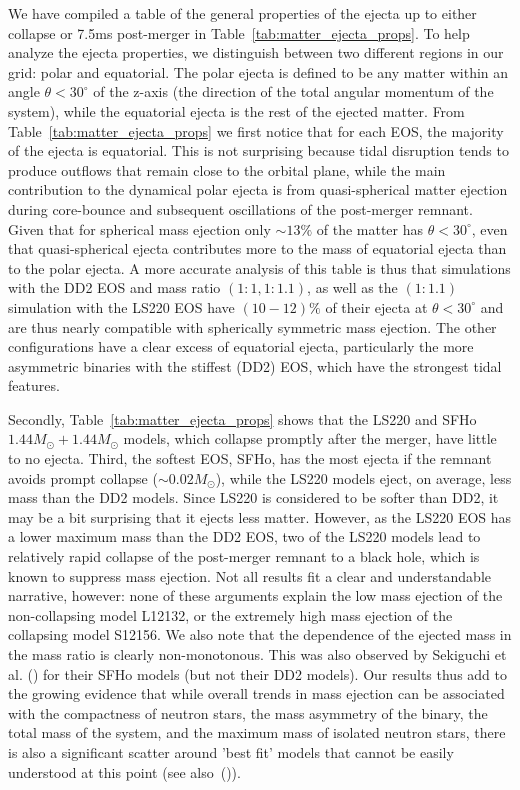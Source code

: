 We have compiled a table of the general properties of the ejecta up to either collapse or 7.5ms post-merger in Table~\ref{tab:matter_ejecta_props}. To help analyze the ejecta properties, we distinguish between two different regions in our grid: polar and equatorial.  The polar ejecta
is defined to be any matter within an angle $\theta < 30^\circ$ of the z-axis (the direction of the total angular momentum of the system), while the equatorial ejecta is the rest of the
ejected matter. From Table~\ref{tab:matter_ejecta_props} we first notice that for each EOS, the majority of the ejecta is equatorial. This is not surprising because tidal disruption tends to produce outflows that remain close to the orbital plane, while the main contribution to the dynamical polar ejecta is from quasi-spherical matter ejection during core-bounce and subsequent oscillations of the post-merger remnant. Given that for spherical mass ejection only $\sim 13\%$ of the matter has $\theta < 30^\circ$, even that quasi-spherical ejecta contributes more to the mass of equatorial ejecta than to the polar ejecta. A more accurate analysis of this table is thus that simulations with the DD2 EOS and mass ratio $(1:1,1:1.1)$, as well as the $(1:1.1)$ simulation with the LS220 EOS have $(10-12)\%$ of their ejecta at $\theta < 30^\circ$ and are thus nearly compatible with spherically symmetric mass ejection. The other configurations have a clear excess of equatorial ejecta, particularly the more asymmetric binaries with the stiffest (DD2) EOS, which have the strongest tidal features.

Secondly, Table~\ref{tab:matter_ejecta_props} shows that the LS220 and SFHo $1.44M_\odot + 1.44M_\odot$ models, which collapse promptly after the merger, have little to no ejecta. Third, the softest EOS, SFHo, has the most ejecta if the remnant avoids prompt collapse ($\sim 0.02M_\odot$), while the LS220 models eject, on average, less mass than the DD2 models. Since LS220 is considered to be softer than DD2, it may be a bit surprising that it ejects less matter. However, as the LS220 EOS has a lower maximum mass than the DD2 EOS, two of the LS220 models lead to relatively rapid collapse of the post-merger remnant to a black hole, which is known to suppress mass ejection. Not all results fit a clear and understandable narrative, however: none of these arguments explain the low mass ejection of the non-collapsing model L12132, or the extremely high mass ejection of the collapsing model S12156. We also note that the dependence of the ejected mass in the mass ratio is clearly non-monotonous. This was also observed by Sekiguchi et al. (\citet*{sekiguchi2016dynamical}) for their SFHo models (but not their DD2 models).
Our results thus add to the growing evidence that while overall trends in mass ejection can be associated with the compactness of neutron stars, the mass asymmetry of the binary, the total mass of the system, and the maximum mass of isolated neutron stars, there is also a significant scatter around 'best fit' models that cannot be easily understood at this point (see also~(\citet*{Dietrich:2016fpt,radice2018binary})).

